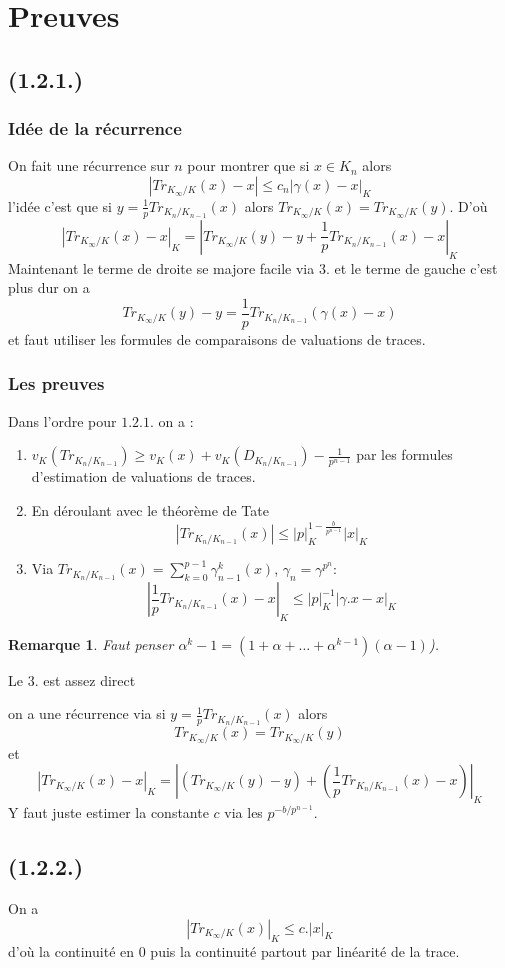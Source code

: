 \documentclass[a4paper,12pt]{article}
\theoremstyle{plain}
\newtheorem{rem}{Remarque}
\theoremstyle{definition}
\theoremstyle{remark}
\begin{document}
\section{Preuves}
\subsection{(1.2.1.)}
\subsubsection{Idée de la récurrence}
On fait une récurrence sur $n$ pour montrer que si
$x\in K_n$ alors
\[|Tr_{K_\infty/K}(x)-x|\leq c_n|\gamma(x)-x|_K\]
l'idée c'est que si $y=\frac{1}{p}Tr_{K_n/K_{n-1}}(x)$
alors $Tr_{K_\infty/K}(x)=Tr_{K_\infty/K}(y)$.
D'où 
\[|Tr_{K_\infty/K}(x)-x|_K=|Tr_{K_\infty/K}(y)-y+\frac{1}{p}Tr_{K_n/K_{n-1}}(x)-x|_K\]
Maintenant le terme de droite se majore facile via
$3.$ et le terme de gauche c'est plus dur on a 
\[Tr_{K_\infty/K}(y)-y=\frac{1}{p}Tr_{K_n/K_{n-1}}(\gamma(x)-x)\]
et faut utiliser les formules de comparaisons de 
valuations de traces.

\subsubsection{Les preuves}
Dans l'ordre pour $1.2.1.$ on a :
\begin{enumerate}
  \item $v_K(Tr_{K_n/K_{n-1}})\geq v_K(x)+v_K(D_{K_n/K_{n-1}}) - \frac{1}{p^{n-1}}$ par les formules 
    d'estimation de valuations de traces.
  \item En déroulant avec le théorème de Tate
    \[|Tr_{K_n/K_{n-1}}(x)|\leq |p|_K^{1-\frac{b}{p^{n-1}}}|x|_K\]
  \item Via $Tr_{K_n/K_{n-1}}(x)=\sum_{k=0}^{p-1}\gamma_{n-1}^k(x)$, $\gamma_n=\gamma^{p^n}$:
    \[|\frac{1}{p}Tr_{K_n/K_{n-1}}(x)-x|_K\leq|p|_K^{-1}|\gamma.x-x|_K\]
\end{enumerate}
\begin{rem}
  Faut penser $\alpha^k-1=(1+\alpha+\ldots+\alpha^{k-1})(\alpha-1)$).
\end{rem}
Le $3.$ est assez direct 

on a une récurrence via si 
$y=\frac{1}{p}Tr_{K_n/K_{n-1}}(x)$ alors
\[Tr_{K_\infty/K}(x)=Tr_{K_\infty/K}(y)\]
et 
\[|Tr_{K_\infty/K}(x)-x|_K=|(Tr_{K_\infty/K}(y)-y)+\left(\frac{1}{p}Tr_{K_n/K_{n-1}}(x)-x\right)|_K\]
Y faut juste estimer la constante $c$ via les 
$p^{-b/p^{n-1}}$.

\subsection{(1.2.2.)}
On a 
\[|Tr_{K_\infty/K}(x)|_K\leq c.|x|_K\]
d'où la continuité en $0$ puis la continuité partout
par linéarité de la trace.
\end{document}
